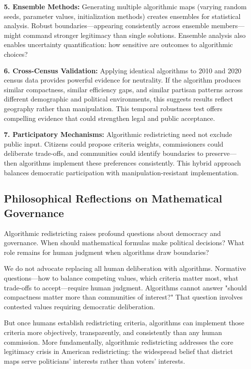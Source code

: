 \textbf{5. Ensemble Methods:} Generating multiple algorithmic maps (varying random seeds, parameter values, initialization methods) creates ensembles for statistical analysis. Robust boundaries—appearing consistently across ensemble members—might command stronger legitimacy than single solutions. Ensemble analysis also enables uncertainty quantification: how sensitive are outcomes to algorithmic choices?

\textbf{6. Cross-Census Validation:} Applying identical algorithms to 2010 and 2020 census data provides powerful evidence for neutrality. If the algorithm produces similar compactness, similar efficiency gaps, and similar partisan patterns across different demographic and political environments, this suggests results reflect geography rather than manipulation. This temporal robustness test offers compelling evidence that could strengthen legal and public acceptance.

\textbf{7. Participatory Mechanisms:} Algorithmic redistricting need not exclude public input. Citizens could propose criteria weights, commissioners could deliberate trade-offs, and communities could identify boundaries to preserve—then algorithms implement these preferences consistently. This hybrid approach balances democratic participation with manipulation-resistant implementation.

\subsection{Philosophical Reflections on Mathematical Governance}

Algorithmic redistricting raises profound questions about democracy and governance. When should mathematical formulas make political decisions? What role remains for human judgment when algorithms draw boundaries?

We do not advocate replacing all human deliberation with algorithms. Normative questions—how to balance competing values, which criteria matter most, what trade-offs to accept—require human judgment. Algorithms cannot answer "should compactness matter more than communities of interest?" That question involves contested values requiring democratic deliberation.

But once humans establish redistricting criteria, algorithms can implement those criteria more objectively, transparently, and consistently than any human commission. More fundamentally, algorithmic redistricting addresses the core legitimacy crisis in American redistricting: the widespread belief that district maps serve politicians' interests rather than voters' interests.

